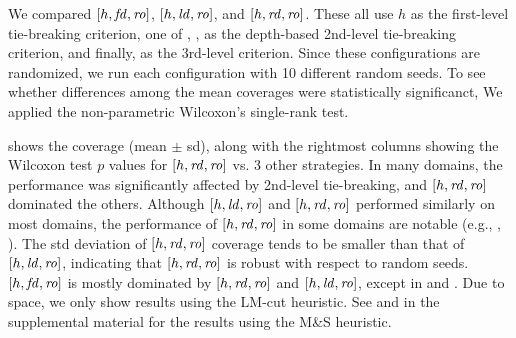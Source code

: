 We compared 
$[h,\mbox{\textit{fd}},\mbox{\textit{ro}}]$, $[h,\mbox{\textit{ld}},\mbox{\textit{ro}}]$, and $[h,\mbox{\textit{rd}},\mbox{\textit{ro}}]$. These all use 
$h$ as the first-level tie-breaking criterion, one of \fd, \ld, \rd as
the depth-based 2nd-level tie-breaking criterion, and finally,
\ro as the 3rd-level criterion.
Since these configurations are randomized, we run each configuration with 10 different random seeds.
To see whether differences among the mean coverages were statistically significanct,
We applied the non-parametric Wilcoxon's single-rank test.

 shows the coverage (mean $\pm$ sd),
along with the rightmost columns showing the 
Wilcoxon test $p$ values  for  $[h,\mbox{\textit{rd}},\mbox{\textit{ro}}]$ vs. 3 other strategies.
In many domains,
the performance was significantly affected by 2nd-level tie-breaking, and
$[h,\mbox{\textit{rd}},\mbox{\textit{ro}}]$ dominated the others. 
Although $[h, \mbox{\textit{ld}}, \mbox{\textit{ro}}]$ and $[h,\mbox{\textit{rd}},\mbox{\textit{ro}}]$ performed similarly on most domains, 
the performance of $[h,\mbox{\textit{rd}},\mbox{\textit{ro}}]$ in some
domains are notable (e.g., , ). 
The std deviation of $[h,\mbox{\textit{rd}},\mbox{\textit{ro}}]$ coverage tends to be smaller
than that of $[h,\mbox{\textit{ld}},\mbox{\textit{ro}}]$, indicating that $[h,\mbox{\textit{rd}},\mbox{\textit{ro}}]$ is robust with respect to random seeds.
$[h,\mbox{\textit{fd}},\mbox{\textit{ro}}]$ is mostly dominated by $[h,\mbox{\textit{rd}},\mbox{\textit{ro}}]$ and $[h,\mbox{\textit{ld}},\mbox{\textit{ro}}]$,
except in  and .
Due to space, we only show results using the LM-cut heuristic. See
 and  in the
supplemental material for the results using the M\&S heuristic.

